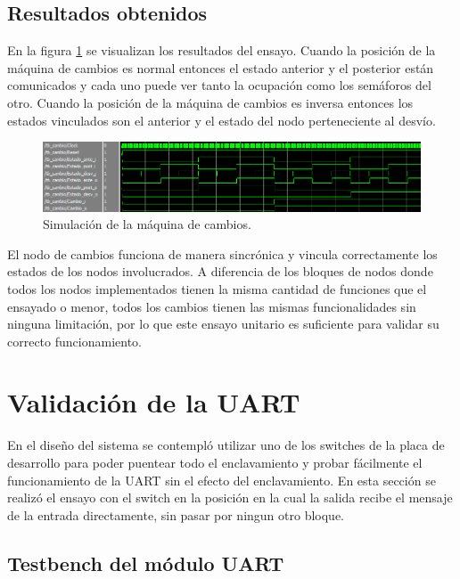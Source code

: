 	\subsection{Resultados obtenidos}
			
		En la figura \ref{fig:Test_Cambios} se visualizan los resultados del ensayo. Cuando la posición de la máquina de cambios es normal entonces el estado anterior y el posterior están comunicados y cada uno puede ver tanto la ocupación como los semáforos del otro. Cuando la posición de la máquina de cambios es inversa entonces los estados vinculados son el anterior y el estado del nodo perteneciente al desvío.
		
		\begin{figure}[h]
		\centering
		\includegraphics[scale=0.55]{./Figures/Test/Cambio}
			\caption{Simulación de la máquina de cambios.}
			\label{fig:Test_Cambios}
		\end{figure}
			
		El nodo de cambios funciona de manera sincrónica y vincula correctamente los estados de los nodos involucrados. A diferencia de los bloques de nodos donde todos los nodos implementados tienen la misma cantidad de funciones que el ensayado o menor, todos los cambios tienen las mismas funcionalidades sin ninguna limitación, por lo que este ensayo unitario es suficiente para validar su correcto funcionamiento.
				
\section{Validación de la UART}

	En el diseño del sistema se contempló utilizar uno de los switches de la placa de desarrollo para poder puentear todo el enclavamiento y probar fácilmente el funcionamiento de la UART sin el efecto del enclavamiento. En esta sección se realizó el ensayo con el switch en la posición en la cual la salida recibe el mensaje de la entrada directamente, sin pasar por ningun otro bloque.

	\subsection{Testbench del módulo UART}
			
